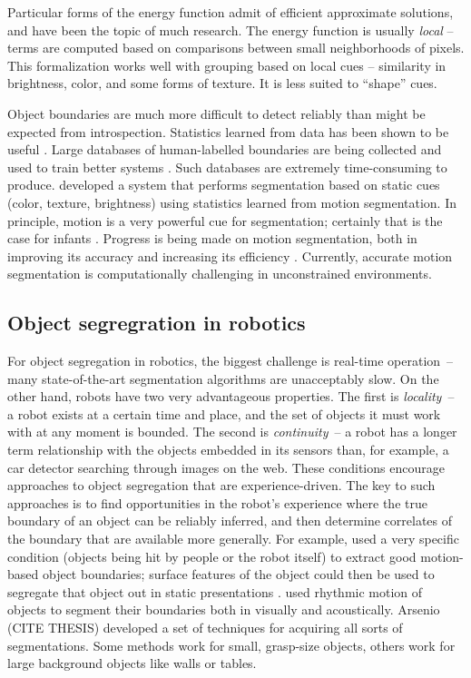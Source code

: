 Particular forms of the energy function admit of efficient 
approximate solutions, and have been the topic of much research.
%
The energy function is usually {\em local} -- terms are computed 
based on comparisons between small neighborhoods of pixels.
%
This formalization works well with grouping based on local
cues -- similarity in brightness, color, and some forms of texture.
It is less suited to ``shape'' cues.


Object boundaries are much more difficult to detect reliably than might be 
expected from introspection.
Statistics learned from data has been shown to be useful
\cite{konishi03statistical}.  Large databases of 
human-labelled boundaries are being collected and
used to train better systems
\cite{martin04learning}.
%
Such databases are extremely time-consuming to produce.
%
 developed a system that performs
segmentation based on static cues (color, texture, brightness)
using statistics learned from motion segmentation.
In principle, motion is a very powerful cue for
segmentation; certainly that is the case for infants
\cite{kellman93kinematic}.
%
Progress is being made on motion segmentation, both 
in improving its accuracy and increasing its efficiency
 \cite{cremers05motion,fowlkes04spectral,smith03motion,smith04layered}.
%
Currently, accurate motion segmentation is 
computationally challenging in unconstrained environments.


\subsection{Object segregration in robotics}

For object segregation in robotics, the biggest challenge is real-time
operation~-- many state-of-the-art segmentation algorithms are
unacceptably slow.  On the other hand, robots have two very
advantageous properties.  
%
The first is
{\em locality}~-- a robot exists at a certain time and place, and the
set of objects it must work with at any moment is bounded.  
%
The second is
{\em continuity}~-- a robot has a longer term relationship with
the objects embedded in its sensors than, for example, a car 
detector searching through images on the web.
%
These conditions encourage approaches to object segregation
that are experience-driven.
%
The key to such approaches is to find
opportunities in the robot's experience where the
true boundary of an object can be reliably inferred,
and then determine correlates of the boundary that 
are available more generally.
%
For example,  used
a very specific condition (objects being hit by
people or the robot itself) to extract good
motion-based object boundaries; surface features
of the object could then be used to segregate that
object out in static presentations \cite{fitzpatrick03object}.
 used rhythmic motion
of objects to segment their boundaries both in
visually and acoustically.
%
Arsenio (CITE THESIS) developed a set of techniques for acquiring all
sorts of segmentations.  Some methods work for small, grasp-size
objects, others work for large background objects like walls or
tables.





